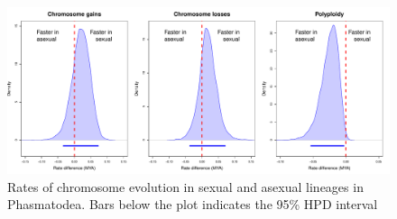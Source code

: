 \documentclass[]{rsos}%
\begin{document}
\begin{figure}[h!]
\centering \includegraphics[width=1\textwidth]{phas_plot.pdf}
\caption{Rates of chromosome evolution in sexual and asexual lineages in Phasmatodea. 
Bars below the plot indicates the 95\% HPD interval}
\label{fig:phas.plot}
\end{figure}
\end{document}

